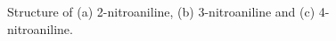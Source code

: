   


\begin{figure}
    \centering
    \caption{Structure of (a) 2-nitroaniline, (b) 3-nitroaniline and (c) 4-nitroaniline.}
    \label{fig:na_structure}
\end{figure}




